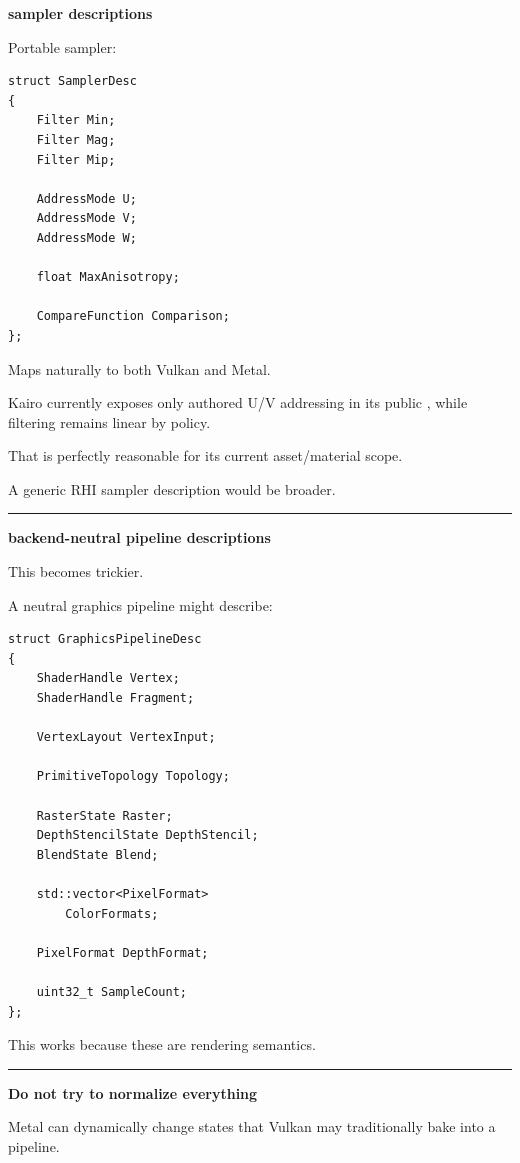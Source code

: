 \textbf{sampler descriptions}

Portable sampler:

\begin{verbatim}
struct SamplerDesc
{
    Filter Min;
    Filter Mag;
    Filter Mip;

    AddressMode U;
    AddressMode V;
    AddressMode W;

    float MaxAnisotropy;

    CompareFunction Comparison;
};
\end{verbatim}

Maps naturally to both Vulkan and Metal.

Kairo currently exposes only authored U/V addressing in its public , while filtering remains linear by policy.

That is perfectly reasonable for its current asset/material scope.

A generic RHI sampler description would be broader.

\begin{center}\rule{0.5\linewidth}{0.5pt}\end{center}

\textbf{backend-neutral pipeline descriptions}

This becomes trickier.

A neutral graphics pipeline might describe:

\begin{verbatim}
struct GraphicsPipelineDesc
{
    ShaderHandle Vertex;
    ShaderHandle Fragment;

    VertexLayout VertexInput;

    PrimitiveTopology Topology;

    RasterState Raster;
    DepthStencilState DepthStencil;
    BlendState Blend;

    std::vector<PixelFormat>
        ColorFormats;

    PixelFormat DepthFormat;

    uint32_t SampleCount;
};
\end{verbatim}

This works because these are rendering semantics.

\begin{center}\rule{0.5\linewidth}{0.5pt}\end{center}

\textbf{Do not try to normalize everything}

Metal can dynamically change states that Vulkan may traditionally bake into a pipeline.

